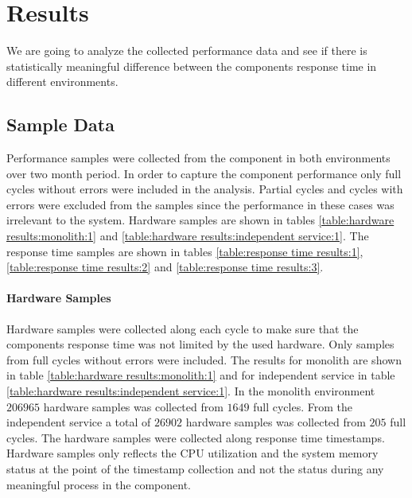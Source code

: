 \chapter{Results\label{results}}
We are going to analyze the collected performance data and see if there is statistically meaningful difference between the components response time in different environments.

\section{Sample Data}
Performance samples were collected from the component in both environments over two month period.
In order to capture the component performance only full cycles without errors were included in the analysis.
Partial cycles and cycles with errors were excluded from the samples since the performance in these cases was irrelevant to the system.
Hardware samples are shown in tables \ref{table:hardware results:monolith:1} and \ref{table:hardware results:independent service:1}.
The response time samples are shown in tables \ref{table:response time results:1}, \ref{table:response time results:2} and \ref{table:response time results:3}.

\subsubsection{Hardware Samples}
Hardware samples were collected along each cycle to make sure that the components response time was not limited by the used hardware.
Only samples from full cycles without errors were included.
The results for monolith are shown in table \ref{table:hardware results:monolith:1} and for independent service in table \ref{table:hardware results:independent service:1}.
In the monolith environment $206965$ hardware samples was collected from $1649$ full cycles.
From the independent service a total of $26902$ hardware samples was collected from $205$ full cycles.
The hardware samples were collected along response time timestamps.
Hardware samples only reflects the CPU utilization and the system memory status at the point of the timestamp collection and not the status during any meaningful process in the component.

